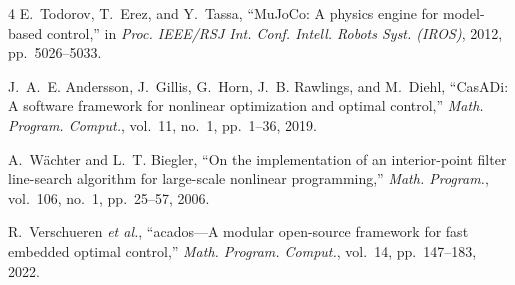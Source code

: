 \documentclass[conference]{IEEEtran}
\begin{document}
\balance
\begin{thebibliography}{4}
E.~Todorov, T.~Erez, and Y.~Tassa, ``MuJoCo: A physics engine for model-based control,'' in \emph{Proc. IEEE/RSJ Int. Conf. Intell. Robots Syst. (IROS)}, 2012, pp.~5026--5033.

J.~A.~E. Andersson, J.~Gillis, G.~Horn, J.~B. Rawlings, and M.~Diehl, ``CasADi: A software framework for nonlinear optimization and optimal control,'' \emph{Math. Program. Comput.}, vol.~11, no.~1, pp.~1--36, 2019.

A.~W\"achter and L.~T. Biegler, ``On the implementation of an interior-point filter line-search algorithm for large-scale nonlinear programming,'' \emph{Math. Program.}, vol.~106, no.~1, pp.~25--57, 2006.

R.~Verschueren \emph{et al.}, ``acados---A modular open-source framework for fast embedded optimal control,'' \emph{Math. Program. Comput.}, vol.~14, pp.~147--183, 2022.
\end{thebibliography}
\end{document}
